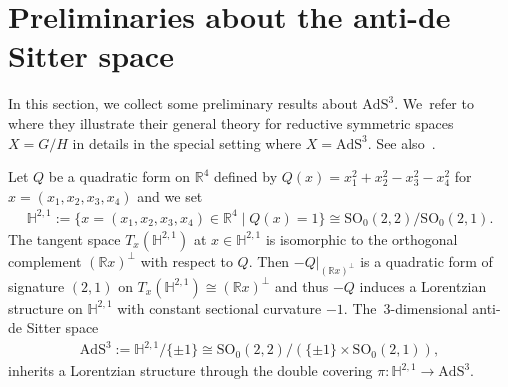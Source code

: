 \section{Preliminaries about the anti-de Sitter space}
\label{Preliminary-AdS}

In this section, we collect some preliminary results about $\mathrm{AdS}^{3}$. We~refer to \cite[Section~9]{KaKob16} where they illustrate their general theory
for reductive symmetric spaces $X=G/H$ in details in the special setting where
$X=\mathrm{AdS}^{3}$. See also~\cite{Kan19}.

Let $Q$ be a quadratic form on $\mathbb{R}^{4}$ defined by
$Q(x) = x_1^2 + x_2^2-x_3^2-x_4^2$ for $x= (x_1,x_2,x_3,x_4)$ and
we set
\begin{gather*}
\mathbb{H}^{2,1}:=\big\{x=(x_1,x_2,x_3,x_4) \in \mathbb{R}^4 \mid Q(x) = 1\big\}
\cong \mathrm{SO}_{0}(2,2)/\mathrm{SO}_{0}(2,1).
\end{gather*}
The tangent space $T_{x}(\mathbb{H}^{2,1})$ at $x\in\mathbb{H}^{2,1}$
is isomorphic to the orthogonal complement $(\mathbb{R} x)^{\bot}$ with respect to $Q$.
Then $-Q|_{(\mathbb{R} x)^{\bot}}$ is
a quadratic form of signature $(2,1)$ on
$T_{x}(\mathbb{H}^{2,1}) \cong (\mathbb{R} x)^{\bot}$ and
thus $-Q$ induces a Lorentzian structure on $\mathbb{H}^{2,1}$
with constant sectional curvature $-1$.
The~$3$-di\-men\-sional anti-de Sitter space
\begin{gather*}
\mathrm{AdS}^{3}:=\mathbb{H}^{2,1}/\{\pm 1\}
\cong \mathrm{SO}_{0}(2,2)/(\{\pm1\}\times\mathrm{SO}_{0}(2,1)),
\end{gather*}
inherits a Lorentzian structure through
the double covering $\pi\colon\mathbb{H}^{2,1}\rightarrow\mathrm{AdS}^{3}$.


